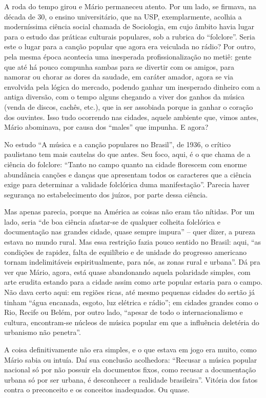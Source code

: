 A roda do tempo girou e Mário permaneceu atento. Por um lado, se
firmava, na década de 30, o ensino universitário, que na USP,
exemplarmente, acolhia a moderníssima ciência social chamada de
Sociologia, em cujo âmbito havia lugar para o estudo das práticas
culturais populares, sob a rubrica do ``folclore''. Seria este o lugar
para a canção popular que agora era veiculada no rádio? Por outro, pela
mesma época acontecia uma inesperada profissionalização no metiê: gente
que até há pouco compunha sambas para se divertir com os amigos, para
namorar ou chorar as dores da saudade, em caráter amador, agora se via
envolvida pela lógica do mercado, podendo ganhar um inesperado dinheiro
com a antiga diversão, com o tempo alguns chegando a viver dos ganhos da
música (venda de discos, cachês, etc.), que ia ser assobiada porque ia
ganhar o coração dos ouvintes. Isso tudo ocorrendo nas cidades, aquele
ambiente que, vimos antes, Mário abominava, por causa dos ``males'' que
impunha. E agora?

No estudo ``A música e a canção populares no Brasil'', de 1936, o
crítico paulistano tem mais cautelas do que antes. Seu foco, aqui, é o
que chama de a ciência do folclore: ``Tanto no campo quanto na cidade
florescem com enorme abundância canções e danças que apresentam todos os
caracteres que a ciência exige para determinar a validade folclórica
duma manifestação''. Parecia haver segurança no estabelecimento dos
juízos, por parte dessa ciência.

Mas apenas parecia, porque na América as coisas não eram tão nítidas.
Por um lado, seria ``de boa ciência afastar-se de qualquer colheita
folclórica e documentação nas grandes cidade, quase sempre impura'' --
quer dizer, a pureza estava no mundo rural. Mas essa restrição fazia
pouco sentido no Brasil: aqui, ``as condições de rapidez, falta de
equilíbrio e de unidade do progresso americano tornam indelimitáveis
espiritualmente, para nós, as zonas rural e urbana''. Dá pra ver que
Mário, agora, está quase abandonando aquela polaridade simples, com arte
erudita estando para a cidade assim como arte popular estaria para o
campo. Não dava certo aqui: em regiões ricas, até mesmo pequenas cidades
do sertão já tinham ``água encanada, esgoto, luz elétrica e rádio''; em
cidades grandes como o Rio, Recife ou Belém, por outro lado, ``apesar de
todo o internacionalismo e cultura, encontram-se núcleos de música
popular em que a influência deletéria do urbanismo não penetra''.

A coisa definitivamente não era simples, e o que estava em jogo era
muito, como Mário sabia ou intuía. Daí sua conclusão acolhedora:
``Recusar a música popular nacional só por não possuir ela documentos
fixos, como recusar a documentação urbana só por ser urbana, é
desconhecer a realidade brasileira''. Vitória dos fatos contra o
preconceito e os conceitos inadequados. Ou quase.

